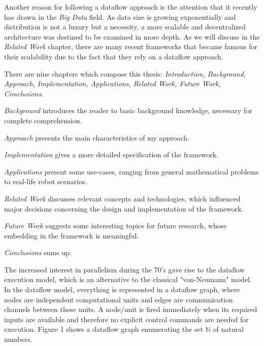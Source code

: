\documentclass{dithesis}
\begin{document}

Another reason for following a dataflow approach is the attention that it recently has drawn in the \textit{Big Data} field. As data size is growing exponentially and distribution is not a luxury but a necessity, a more scalable and decentralized architecture was destined to be examined in more depth. As we will discuss in the \textit{Related Work} chapter, there are many recent frameworks that became famous for their scalability due to the fact that they rely on a dataflow approach.


There are nine chapters which compose this thesis: \textit{Introduction, Background, Approach, Implementation, Applications, Related Work, Future Work, Conclusions}.

\textit{Background} introduces the reader to basic background knowledge, necessary for complete comprehension.

\textit{Approach} presents the main characteristics of my approach.

\textit{Implementation} gives a more detailed specification of the framework.

\textit{Applications} present some use-cases, ranging from general mathematical problems to real-life robot scenarios.

\textit{Related Work} discusses relevant concepts and technologies, which influenced major decisions concerning the design and implementation of the framework.

\textit{Future Work} suggests some interesting topics for future research, whose embedding in the framework is meaningful.

\textit{Conclusions} sums up.


The increased interest in parallelism during the 70's gave rise to the dataflow execution model, which is an alternative to the classical "von-Neumann" model. In the dataflow model, everything is represented in a dataflow graph, where nodes are independent computational units  and edges are communication channels between these units. A node/unit is fired immediately when its required inputs are available and therefore no explicit control commands are needed for execution. Figure 1 shows a dataflow graph enumerating the set $\mathbb{N}$ of natural numbers.
\end{document}
